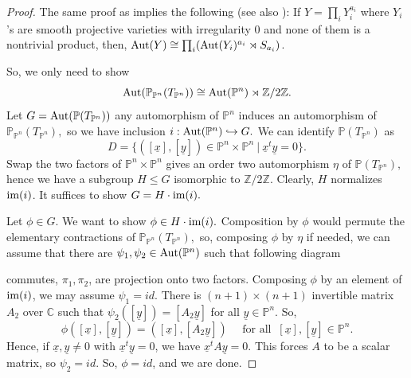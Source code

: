 \documentclass[12pt,reqno]{amsart}
\theoremstyle{definition}
\numberwithin{equation}{section}
\begin{document}
\begin{proof}

The same proof as {\cite[Theorem 2.7, Corollary 2.8]{Ha}} implies the following (see also {\cite[Theorem 4.1]{Og}}): If
$Y = \prod _{i} Y_{i}^{a_{i}}$ where $Y_i$'s are smooth projective varieties with irregularity $0$ and none of them is a nontrivial product, then, $\textnormal{Aut}(Y) \cong \prod_{i}(\textnormal{Aut}(Y_{i})^{a_{i}}\rtimes S_{a_{i}})$.


So, we only need to show  $$ \textnormal{Aut} (\mathbb{P}_{\mathbb{P}^n}(T_{\mathbb{P}^n}))\cong \textnormal{Aut}({\mathbb{P}^n}) \rtimes \mathbb{Z}/2 \mathbb{Z}.$$ Let $G= \textnormal{Aut} (\mathbb{P}(T_{\mathbb{P}^n}))$ any automorphism of $ \mathbb{P}^n$  induces an automorphism of $ \mathbb{P}_{\mathbb{P}^n}(T_{\mathbb{P}^n}),$ so we have inclusion 
    $ i: \textnormal{Aut}(\mathbb{P}^n) \hookrightarrow G .$ We can identify $ \mathbb{P}(T_{\mathbb{P}^n})$ as
      $$ D= \{ ([\underline{x}],[\underline{y}]) \in \mathbb{P}^n \times \mathbb{P}^n \medspace | \medspace \underline{x}^t \underline{y}=0 \}.$$ Swap the two factors of $ \mathbb{P}^n \times \mathbb{P}^n$ gives an order two automorphism $\eta$ of $ \mathbb{P}(T_{\mathbb{P}^n}),$ hence we have a subgroup $ H \leq G$ isomorphic to $ \mathbb{Z}/2\mathbb{Z}.$ Clearly, $H$ normalizes $ \textnormal{im}(i)$. It suffices to show $ G= H \cdot \textnormal{im}(i).$ 
      
      Let $ \phi \in G.$ We want to show $ \phi \in H \cdot \textnormal{im}(i).$ Composition by $ \phi$ would permute the elementary contractions of $ \mathbb{P}_{\mathbb{P}^n}(T_{\mathbb{P}^n}),$ so, composing $\phi$ by $ \eta $ if needed, we can assume that there are $ \psi_{1}, \psi_{2}\in \textnormal{Aut} (\mathbb{P}^n)$  such that following diagram
       \begin{center}
\end{center}
commutes, $\pi_{1}, \pi_{2}$, are projection onto two factors. Composing $ \phi$ by an element of $ \textnormal{im}(i)$, we may assume $ \psi_{1}=id.$ There is $ (n+1) \times (n+1)$ invertible matrix $A_{2}$ over $ \mathbb{C}$ such that $ \psi_{2}([\underline{y}])= [A_{2}\underline{y}]$ for all $ \underline{y} \in \mathbb{P}^n$. So, 
$$ \phi([\underline{x}],[ \underline{y}])= ( [\underline{x}], [A_{2}\underline{y}]) \quad \text{ for all } \medspace [\underline{x}], [\underline{y}] \in \mathbb{P}^n.$$
Hence, if $ \underline{x}, \underline{y}\neq 0$  with $ \underline{x}^{t}\underline{y}=0$, we have $ \underline{x}^{t} A \underline{y}=0.$ This forces $A$ to be a scalar matrix, so $ \psi_{2}= id.$ So, $ \phi= id$, and we are done.
\end{proof} 
\end{document}
